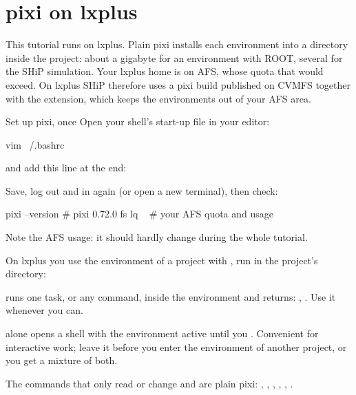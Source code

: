 \section{pixi on lxplus}
\label{sec:pixicvmfs}

This tutorial runs on lxplus. Plain pixi installs each environment into a
directory  inside the project: about a gigabyte for an
environment with ROOT, several for the SHiP simulation. Your lxplus home is
on AFS, whose quota that would exceed. On lxplus SHiP therefore uses a pixi
build published on CVMFS together with the  extension, which
keeps the environments out of your AFS area.

\begin{exercise}{Set up pixi, once}
\label{ex:pixicvmfs}
Open your shell's start-up file in your editor:
\begin{shell}
vim ~/.bashrc
\end{shell}
and add this line at the end:
Save, log out and in again (or open a new terminal), then check:
\begin{shell}
pixi --version                 # pixi 0.72.0
fs lq ~                        # your AFS quota and usage
\end{shell}
Note the AFS usage: it should hardly change during the whole tutorial.
\end{exercise}

On lxplus you use the environment of a project with , run
in the project's directory:

\begin{description}[style=nextline]
  \item[\cmd{pixi cvmfs <task or command>}] runs one task, or any command,
    inside the environment and returns: ,
    . Use it whenever you can.
  \item[\cmd{pixi cvmfs}] alone opens a shell with the environment active
    until you . Convenient for interactive work; leave it before
    you enter the environment of another project, or you get a mixture of
    both.
\end{description}

The commands that only read or change  and 
are plain pixi: , ,
, , , .

